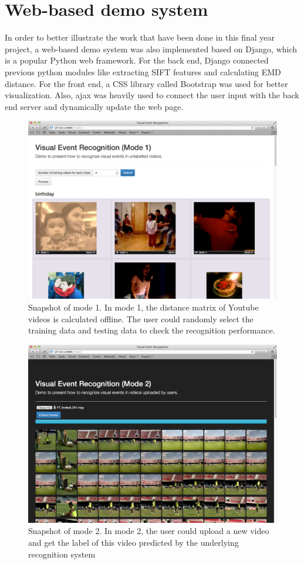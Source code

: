\section{Web-based demo system}
In order to better illustrate the work that have been done in this final year project, a web-based demo system was also implemented based on Django, which is a popular Python web framework. For the back end, Django connected previous python modules like extracting SIFT features and calculating EMD distance. For the front end, a CSS library called Bootstrap was used for better visualization. Also, ajax was heavily used to connect the user input with the back end server and dynamically update the web page. \\

\begin{figure}[!ht]
\centering
	\includegraphics[scale=0.2]{./mode1.png}
\caption{Snapshot of mode 1. In mode 1, the distance matrix of Youtube videos is calculated offline. The user could randomly select the training data and testing data to check the recognition performance.}
\end{figure}

\begin{figure}[!ht]
\centering
	\includegraphics[scale = 0.2]{./mode2.png}
\caption{Snapshot of mode 2. In mode 2, the user could upload a new video and get the label of this video predicted by the underlying recognition system}
\end{figure}


